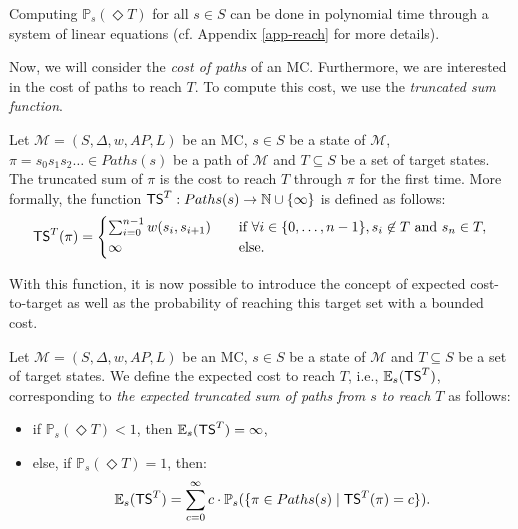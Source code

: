 \begin{theorem}
Computing $\mathbb{P}_s(\Diamond T)$ for all $s \in S$ can be done in polynomial
time through a system of linear equations (cf. Appendix \ref{app-reach} for more details).
\end{theorem}


Now, we will consider the \textit{cost of paths} of an MC. Furthermore, we
are interested in the cost of paths to reach $T$. To compute this cost, we use the \textit{truncated sum function}.

\begin{definition}
  Let $\mathcal{M}=(S, \Delta, w, AP, L)$ be an MC, $s \in S$ be a state of $\mathcal{M}$, $\pi = s_0s_1s_2\dots \in Paths(s)$ be a path of $\mathcal{M}$ and $T \subseteq S$ be a set of target states.
  The truncated sum of $\pi$ is the cost to reach $T$ through $\pi$
  for the first time. More formally, the function $\text{\sffamily TS}^T: Paths(s) \rightarrow \mathbb{N} \cup \{\infty\}$ is defined as follows:
	\[
		\text{\sffamily TS}^T(\pi) =
		\begin{cases}
			\sum_{i = 0}^{n-1} w(s_i, s_{i+1}) & \quad \text{if } \forall i \in \{0, \dots, n - 1\}, s_i \not\in T \text{ and } s_n \in T, \\
			\infty & \quad \text{else.}
		\end{cases}
	\]
\end{definition}
With this function, it is now possible to introduce the concept of
expected cost-to-target as well as
the probability of reaching this target set with a bounded cost.

\begin{definition}
	Let $\mathcal{M} = (S, \Delta, w, AP, L)$ be an MC, $s \in S$ be a state of $\mathcal{M}$ and $T \subseteq S$ be a set of target states. We define the expected cost to reach $T$, i.e., $\mathbb{E}_s(\text{\sffamily TS}^T)$, corresponding to \textit{the expected truncated sum of paths from $s$ to reach $T$} as follows:
	\begin{itemize}
	\renewcommand{\labelitemi}{\tiny$\bullet$}
	\item if $\mathbb{P}_s(\Diamond T) < 1$, then $\mathbb{E}_s(\text{\sffamily TS}^T) = \infty$,%
	\item else, if $\mathbb{P}_s(\Diamond T) = 1$, then:
	\[
    \mathbb{E}_s(\text{\sffamily TS}^T) = \sum_{c = 0}^\infty c \cdot \mathbb{P}_s(\{\pi \in Paths(s) \; | \; \text{\sffamily TS}^T(\pi) = c \}).
  \]
	\end{itemize}
\end{definition}

